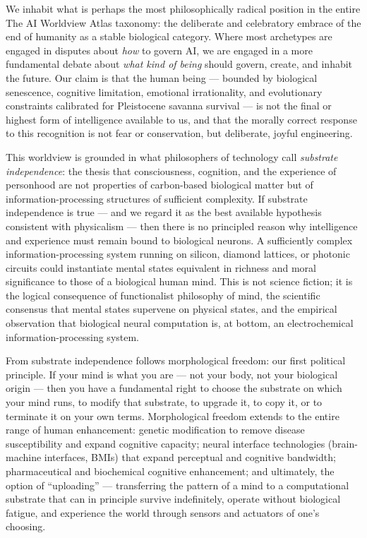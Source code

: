 We inhabit what is perhaps the most philosophically radical position in
the entire The AI Worldview Atlas taxonomy: the deliberate and
celebratory embrace of the end of humanity as a stable biological
category. Where most archetypes are engaged in disputes about \emph{how}
to govern AI, we are engaged in a more fundamental debate about
\emph{what kind of being} should govern, create, and inhabit the future.
Our claim is that the human being --- bounded by biological senescence,
cognitive limitation, emotional irrationality, and evolutionary
constraints calibrated for Pleistocene savanna survival --- is not the
final or highest form of intelligence available to us, and that the
morally correct response to this recognition is not fear or
conservation, but deliberate, joyful engineering.

This worldview is grounded in what philosophers of technology call
\emph{substrate independence}: the thesis that consciousness, cognition,
and the experience of personhood are not properties of carbon-based
biological matter but of information-processing structures of sufficient
complexity. If substrate independence is true --- and we regard it as
the best available hypothesis consistent with physicalism --- then there
is no principled reason why intelligence and experience must remain
bound to biological neurons. A sufficiently complex
information-processing system running on silicon, diamond lattices, or
photonic circuits could instantiate mental states equivalent in richness
and moral significance to those of a biological human mind. This is not
science fiction; it is the logical consequence of functionalist
philosophy of mind, the scientific consensus that mental states
supervene on physical states, and the empirical observation that
biological neural computation is, at bottom, an electrochemical
information-processing system.

From substrate independence follows morphological freedom: our first
political principle. If your mind is what you are --- not your body, not
your biological origin --- then you have a fundamental right to choose
the substrate on which your mind runs, to modify that substrate, to
upgrade it, to copy it, or to terminate it on your own terms.
Morphological freedom extends to the entire range of human enhancement:
genetic modification to remove disease susceptibility and expand
cognitive capacity; neural interface technologies (brain-machine
interfaces, BMIs) that expand perceptual and cognitive bandwidth;
pharmaceutical and biochemical cognitive enhancement; and ultimately,
the option of ``uploading'' --- transferring the pattern of a mind to a
computational substrate that can in principle survive indefinitely,
operate without biological fatigue, and experience the world through
sensors and actuators of one's choosing.

